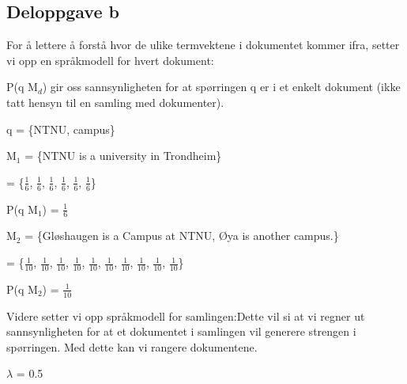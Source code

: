 \subsection*{Deloppgave b}

For å lettere å forstå hvor de ulike termvektene i dokumentet kommer ifra, setter vi opp en språkmodell for hvert dokument:

\noindent P(q \textbar  M$_{d}$) gir oss sannsynligheten for at spørringen q er i et enkelt dokument (ikke tatt hensyn til en samling med dokumenter).

\vspace{2mm}

q = \{NTNU, campus\}

\vspace{2mm}

M$_{1}$ = \{NTNU is a university in Trondheim\}

\vspace{2mm}

\hspace{3.2ex} = \{$\frac{1}{6}$, $\frac{1}{6}$, $\frac{1}{6}$, $\frac{1}{6}$, $\frac{1}{6}$, $\frac{1}{6}$\}

\vspace{2mm}

P(q \textbar  M$_{1}$) = $\frac{1}{6}$

\vspace{5mm}

M$_{2}$ = \{Gløshaugen is a Campus at NTNU, Øya is another campus.\}\footnotemark[1]

\vspace{2mm}

\hspace{3.2ex} = \{$\frac{1}{10}$, $\frac{1}{10}$, $\frac{1}{10}$, $\frac{1}{10}$, $\frac{1}{10}$, $\frac{1}{10}$, $\frac{1}{10}$, $\frac{1}{10}$, $\frac{1}{10}$, $\frac{1}{10}$\}

\vspace{2mm}

P(q \textbar M$_{2}$) = $\frac{1}{10}$

\vspace{5mm}

\noindent Videre setter vi opp språkmodell for samlingen:\footnotemark[2]
\noindent Dette vil si at vi regner ut sannsynligheten for at et dokumentet i samlingen vil generere strengen i spørringen. Med dette kan vi rangere dokumentene.

\vspace{2mm}

$\lambda$ = 0.5

